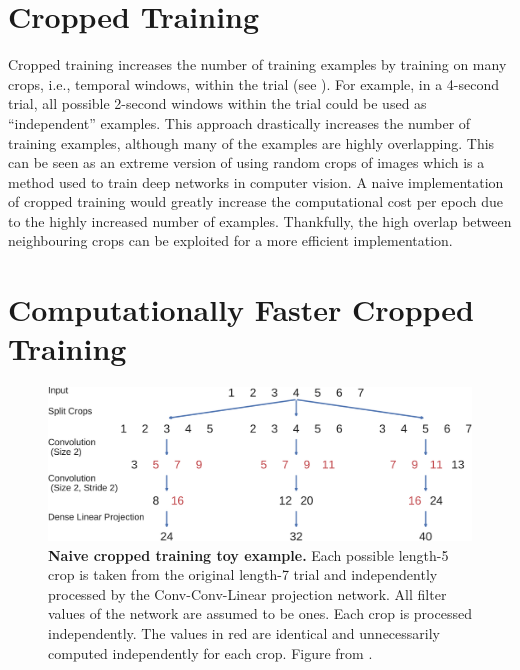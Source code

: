 \section{Cropped Training}\label{cropped-training-section}

Cropped training increases the number of training examples by training
on many crops, i.e., temporal windows, within the trial (see ). For example, in
a 4-second trial, all possible 2-second windows within the trial could
be used as ``independent'' examples. This approach drastically increases
the number of training examples, although many of the examples are
highly overlapping. This can be seen as an extreme version of using
random crops of images which is a method used to train deep networks in
computer vision. A naive implementation of cropped training would
greatly increase the computational cost per epoch due to the highly
increased number of examples. Thankfully, the high overlap between
neighbouring crops can be exploited for a more efficient implementation.



\section{Computationally Faster Cropped
Training}\label{computationally-faster-cropped-training}


\begin{figure}[ht]
    \myfloatalign
    \includegraphics[width=1\linewidth]{images/Multiple_Prediction_Matplotlib_Graphics.ipynb.2.png}
    \caption[Naive cropped training toy example]{
\textbf{Naive cropped training toy example.} Each possible length-5 crop
is taken from the original length-7 trial and independently processed by
the Conv-Conv-Linear projection network. All filter values of the
network are assumed to be ones. Each crop is processed independently.
The values in red are identical and unnecessarily computed independently
for each crop. Figure from \cite{schirrmeisterdeephbm2017}.
}
\label{cropped-naive-computation-figure}
\end{figure}



